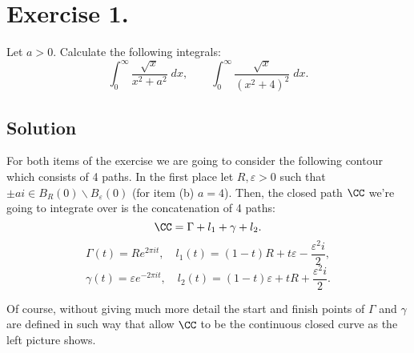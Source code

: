 \section*{Exercise 1.}
Let $a > 0$. Calculate the following integrals:
\[ \int_{0}^{\infty}{\frac{\sqrt{x}}{x^{2}+a^{2}}}\; d x,\hspace{2em} \int_{0}^{\infty}{\frac{\sqrt{x}}{(x^{2}+4)^2}}\; d x.
\]

\subsection*{Solution}

\begin{multicols}{2}
    \begin{figure}[H]
        \centering
        
    \end{figure} 

    For both items of the exercise we are going to consider the following contour which consists of 4 paths. In the first place let $R,\varepsilon > 0$ such that $\pm ai \in B_R(0)\backslash B_\varepsilon(0)$ (for item (b) $a = 4$). Then, the closed path $\CC$ we're going to integrate over is the concatenation of 4 paths:
    \[ \CC = \Gamma + l_1 + \gamma + l_2. \]
    \[ \Gamma(t) = R e^{2\pi i t},\hspace{1em} l_1(t) = (1-t)R + t \varepsilon - \frac{\varepsilon^2 i}{2}, \]
    \[ \gamma(t) = \varepsilon e^{-2\pi i t}, \hspace{1em} l_2(t) = (1-t)\varepsilon + t R + \frac{\varepsilon^2 i}{2}. \]
\end{multicols}

Of course, without giving much more detail the start and finish points of $\Gamma$ and $\gamma$ are defined in such way that allow $\CC$ to be the continuous closed curve as the left picture shows.

